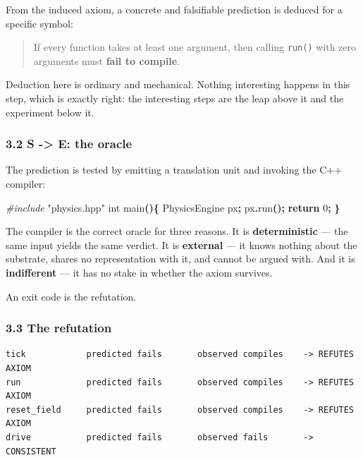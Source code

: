 \documentclass[
  11pt,
  a4paper,
]{article}
\newenvironment{Shaded}{\begin{snugshade}}{\end{snugshade}}
\newcommand{\ControlFlowTok}[1]{\textcolor[rgb]{0.13,0.29,0.53}{\textbf{#1}}}
\newcommand{\DataTypeTok}[1]{\textcolor[rgb]{0.13,0.29,0.53}{#1}}
\newcommand{\DecValTok}[1]{\textcolor[rgb]{0.00,0.00,0.81}{#1}}
\newcommand{\ImportTok}[1]{#1}
\newcommand{\NormalTok}[1]{#1}
\newcommand{\OperatorTok}[1]{\textcolor[rgb]{0.81,0.36,0.00}{\textbf{#1}}}
\newcommand{\PreprocessorTok}[1]{\textcolor[rgb]{0.56,0.35,0.01}{\textit{#1}}}
\begin{document}
From the induced axiom, a concrete and falsifiable prediction is deduced
for a specific symbol:

\begin{quote}
If every function takes at least one argument, then calling
\texttt{run()} with zero arguments must \textbf{fail to compile}.
\end{quote}

Deduction here is ordinary and mechanical. Nothing interesting happens
in this step, which is exactly right: the interesting steps are the leap
above it and the experiment below it.

\subsubsection{3.2 S -\textgreater{} E: the
oracle}\label{s---e-the-oracle}

The prediction is tested by emitting a translation unit and invoking the
C++ compiler:

\begin{Shaded}
\begin{Highlighting}[]
\PreprocessorTok{\#include }\ImportTok{"physics.hpp"}
\DataTypeTok{int}\NormalTok{ main}\OperatorTok{()\{}\NormalTok{ PhysicsEngine px}\OperatorTok{;}\NormalTok{ px}\OperatorTok{.}\NormalTok{run}\OperatorTok{();} \ControlFlowTok{return} \DecValTok{0}\OperatorTok{;} \OperatorTok{\}}
\end{Highlighting}
\end{Shaded}

The compiler is the correct oracle for three reasons. It is
\textbf{deterministic} --- the same input yields the same verdict. It is
\textbf{external} --- it knows nothing about the substrate, shares no
representation with it, and cannot be argued with. And it is
\textbf{indifferent} --- it has no stake in whether the axiom survives.

An exit code is the refutation.

\subsubsection{3.3 The refutation}\label{the-refutation}

\begin{verbatim}
tick            predicted fails       observed compiles    -> REFUTES AXIOM
run             predicted fails       observed compiles    -> REFUTES AXIOM
reset_field     predicted fails       observed compiles    -> REFUTES AXIOM
drive           predicted fails       observed fails       -> CONSISTENT
\end{verbatim}
\end{document}
